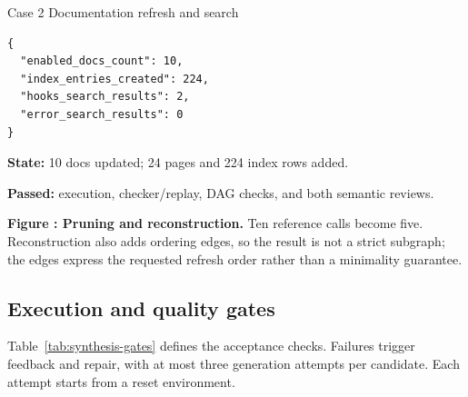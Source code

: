 \begin{systembox}{Case 2 \quad Documentation refresh and search}
\noindent\begin{minipage}[t]{.62\linewidth}
\vspace{0pt}
\begin{lstlisting}[style=casejson]
{
  "enabled_docs_count": 10,
  "index_entries_created": 224,
  "hooks_search_results": 2,
  "error_search_results": 0
}
\end{lstlisting}
\end{minipage}\hfill\begin{minipage}[t]{.34\linewidth}
\vspace{3pt}\raggedright
\textbf{State:} 10 docs updated; 24 pages and 224 index rows added.\par\smallskip
\textbf{Passed:} execution, checker/replay, DAG checks, and both semantic reviews.
\end{minipage}
\end{systembox}
\begingroup\small
{}\label{fig:reconstruction-case}
\noindent\textbf{Figure \thefigure: Pruning and reconstruction.} Ten reference calls become five. Reconstruction also adds ordering edges, so the result is not a strict subgraph; the edges express the requested refresh order rather than a minimality guarantee.
\endgroup

\clearpage
\subsection{Execution and quality gates}
\label{app:synthesis-gates}

Table~\ref{tab:synthesis-gates} defines the acceptance checks. Failures trigger feedback and repair, with at most three generation attempts per candidate. Each attempt starts from a reset environment.

